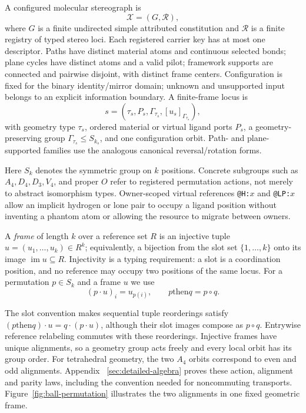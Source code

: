 \documentclass[pdflatex,sn-mathphys-num,referee,lineno]{sn-jnl}
\newcommand{\code}[1]{\texttt{#1}}
\theoremstyle{plain}
\theoremstyle{remark}
\theoremstyle{definition}
\begin{document}
A configured molecular stereograph is
\[
  \mathcal X=(G,\mathcal R),
\]
where \(G\) is a finite undirected simple attributed constitution and
\(\mathcal R\) is a finite registry of typed stereo loci. Each registered
carrier key has at most one descriptor. Paths have distinct material atoms
and continuous selected bonds; plane cycles have distinct atoms and a valid
pilot; framework supports are connected and pairwise disjoint, with distinct
frame centers. Configuration is fixed for the binary identity/mirror domain;
unknown and unsupported input belongs to an explicit information boundary.
A finite-frame locus is
\[
  s=(\tau_s,P_s,\Gamma_{\tau_s},[u_s]_{\Gamma_{\tau_s}}),
\]
with geometry type \(\tau_s\), ordered material or virtual ligand ports
\(P_s\), a geometry-preserving group
\(\Gamma_{\tau_s}\leq S_{k_s}\), and one configuration orbit.  Path- and
plane-supported families use the analogous canonical reversal/rotation forms.

Here \(S_k\) denotes the symmetric group on \(k\) positions.  Concrete
subgroups such as \(A_4,D_4,D_3,V_4\), and proper \(O\) refer to registered
permutation actions, not merely to abstract isomorphism types.  Owner-scoped
virtual references \code{@H:\(x\)} and \code{@LP:\(x\)} allow an implicit
hydrogen or lone pair to occupy a ligand position without inventing a phantom
atom or allowing the resource to migrate between owners.

A \emph{frame} of length \(k\) over a reference set \(R\) is an injective tuple
\(u=(u_1,\ldots,u_k)\in R^k\); equivalently, a bijection from the slot set
\(\{1,\ldots,k\}\) onto its image \(\operatorname{im}u\subseteq R\).
Injectivity is a typing requirement: a slot is a coordination position, and no
reference may occupy two positions of the same locus.  For a permutation
\(p\in S_k\) and a frame \(u\) we use
\begin{equation}
  (p\cdot u)_i=u_{p(i)},\qquad
  p\mathbin{\mathrm{then}}q=p\circ q .
  \label{eq:action}
\end{equation}

The slot convention makes sequential tuple reorderings satisfy
\((p\mathbin{\mathrm{then}}q)\cdot u=q\cdot(p\cdot u)\), although their slot
images compose as \(p\circ q\). Entrywise reference relabeling commutes with
these reorderings. Injective frames have unique alignments, so a geometry group
acts freely and every local orbit has its group order. For tetrahedral geometry,
the two \(A_4\) orbits correspond to even and odd alignments. Appendix~
\ref{sec:detailed-algebra} proves these action, alignment and parity laws,
including the convention needed for noncommuting transports.
Figure~\ref{fig:ball-permutation} illustrates the two alignments in one fixed
geometric frame.
\end{document}
